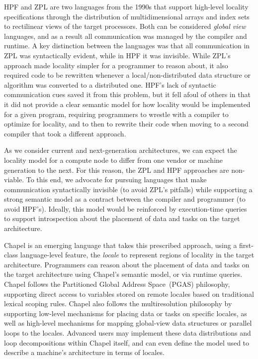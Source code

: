 HPF and ZPL are two languages from the 1990s that support high-level
locality specifications through the distribution of multidimensional
arrays and index sets to rectilinear views of the target processors.
Both can be considered \emph{global view} languages, and as a result
all communication was managed by the compiler and runtime.  A key
distinction between the languages was that all communication in ZPL
was syntactically evident, while in HPF it was invisible.  While ZPL's
approach made locality simpler for a programmer to reason about, it
also required code to be rewritten whenever a local/non-distributed
data structure or algorithm was converted to a distributed one.  HPF's
lack of syntactic communication cues saved it from this problem, but
it fell afoul of others in that it did not provide a clear semantic
model for how locality would be implemented for a given program,
requiring programmers to wrestle with a compiler to optimize for
locality, and to then to rewrite their code when moving to a second
compiler that took a different approach.

As we consider current and next-generation architectures, we can
expect the locality model for a compute node to differ from one vendor
or machine generation to the next.  For this reason, the ZPL and HPF
approaches are non-viable.  To this end, we advocate for pursuing
languages that make communication syntactically invisible (to avoid
ZPL's pitfalls) while supporting a strong semantic model as a contract
between the compiler and programmer (to avoid HPF's).  Ideally, this
model would be reinforced by execution-time queries to support
introspection about the placement of data and tasks on the target
architecture.

Chapel is an emerging language that takes this prescribed approach,
using a first-class language-level feature, the \emph{locale} to
represent regions of locality in the target architecture.  Programmers
can reason about the placement of data and tasks on the target
architecture using Chapel's semantic model, or via runtime queries.
Chapel follows the Partitioned Global Address Space~(PGAS) philosophy,
supporting direct access to variables stored on remote locales based
on traditional lexical scoping rules.  Chapel also follows the
multiresolution philosophy by supporting low-level mechanisms for
placing data or tasks on specific locales, as well as high-level
mechanisms for mapping global-view data structures or parallel loops
to the locales.  Advanced users may implement these data distributions
and loop decompositions within Chapel itself, and can even define the
model used to describe a machine's architecture in terms of locales.


